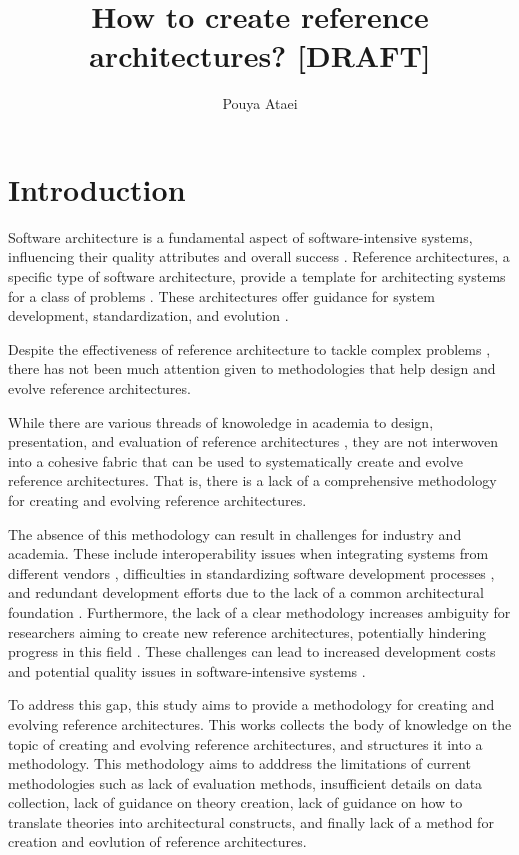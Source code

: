\documentclass[12pt,a4paper]{article}
\title{How to create reference architectures? [DRAFT]}
\author{Pouya Ataei}
\date{}
\begin{document}
\maketitle

\section{Introduction}

Software architecture is a fundamental aspect of software-intensive systems, influencing their quality attributes and overall success \cite{bass2012software}. Reference architectures, a specific type of software architecture, provide a template for architecting systems for a class of problems \cite{angelov2012framework}. These architectures offer guidance for system development, standardization, and evolution \cite{cloutier2010concept}.


Despite the effectiveness of reference architecture to tackle complex problems \cite{angelov2012designing}, there has not been much attention given to methodologies that help design and evolve reference architectures. 

While there are various threads of knowoledge in academia to design, presentation, and evaluation of reference architectures \cite{dobrica2008approach,galster2011empirically,muller2008right}, they are not interwoven into a cohesive fabric that can be used to systematically create and evolve reference architectures. That is, there is a lack of a comprehensive methodology for creating and evolving reference architectures.

The absence of this methodology can result in challenges for industry and academia. These include interoperability issues when integrating systems from different vendors \cite{weyrich2015reference}, difficulties in standardizing software development processes \cite{garciamoreno2020microservices}, and redundant development efforts due to the lack of a common architectural foundation \cite{nakagawa2011aspect}. Furthermore, the lack of a clear methodology increases ambiguity for researchers aiming to create new reference architectures, potentially hindering progress in this field \cite{Angelov2012}. These challenges can lead to increased development costs and potential quality issues in software-intensive systems \cite{antinyan2020revealing}.

To address this gap, this study aims to provide a methodology for creating and evolving reference architectures. This works collects the body of knowledge on the topic of creating and evolving reference architectures, and structures it into a methodology. This methodology aims to adddress the limitations of current methodologies such as lack of evaluation methods, insufficient details on data collection, lack of guidance on theory creation, lack of guidance on how to translate theories into architectural constructs, and finally lack of a method for creation and eovlution of reference architectures. 
\end{document}

